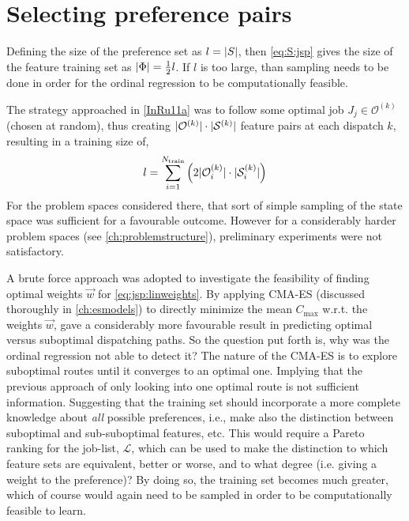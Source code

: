 \section{Selecting preference pairs}\label{sec:S:strategies}
Defining the size of the preference set as $l=\lvert S\rvert$, then \cref{eq:S:jsp} gives the size of the feature training set as $\lvert\Phi\rvert=\frac{1}{2}l$.
If $l$ is too large, than sampling needs to be done in order for the ordinal regression to be computationally feasible.


The strategy approached in  \cref{InRu11a} was to follow some optimal job 
$J_j\in\mathcal{O}^{(k)}$ (chosen at random), thus creating 
$\lvert\mathcal{O}^{(k)}\rvert\cdot\lvert\mathcal{S}^{(k)}\rvert$ feature pairs at each 
dispatch $k$, resulting in a training size of,
\begin{equation}\label{eq:sizeS_b}
	l =  \sum_{i=1}^{N_{\text{train}}} \left(2 \abs{\mathcal{O}^{(k)}_i}\cdot \abs{\mathcal{S}^{(k)}_i} \right)
\end{equation}
For the problem spaces considered there, that sort of simple sampling of the state space was sufficient for a favourable outcome. However for a considerably harder problem spaces (see \cref{ch:problemstructure}), preliminary experiments were not satisfactory. 

A brute force approach was adopted to investigate the feasibility of finding optimal weights $\vec{w}$ for \cref{eq:jsp:linweights}. 
By applying CMA-ES (discussed thoroughly in \cref{ch:esmodels}) to directly minimize the mean $C_{\max}$  w.r.t. the weights $\vec{w}$, gave a considerably more favourable result in predicting optimal versus suboptimal dispatching paths. 
So the question put forth is, why was the ordinal regression not able to detect it?
The nature of the CMA-ES is to explore suboptimal routes until it converges to an optimal one. 
Implying that the previous approach of only looking into one optimal route is not sufficient information. 
Suggesting that the training set should incorporate a more complete knowledge about \emph{all} possible preferences, i.e., make also the distinction between suboptimal and sub-suboptimal features, etc.  
This would require a Pareto ranking for the job-list, $\mathcal{L}$, which can 
be used to make the distinction to which feature sets are equivalent, better or 
worse, and to what degree (i.e. giving a weight to the preference)? 
By doing so, the training set becomes much greater, which of course would again need to be sampled in order to be computationally feasible to learn. 


